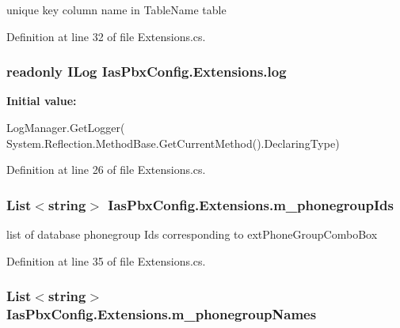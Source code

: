 unique key column name in TableName table 

Definition at line 32 of file Extensions.cs.\hypertarget{class_ias_pbx_config_1_1_extensions_ab43ad241e3cdaf1c1d00df49f8e1e3de}{
\subsubsection[{log}]{\setlength{\rightskip}{0pt plus 5cm}readonly ILog {\bf IasPbxConfig.Extensions.log}}}
\label{class_ias_pbx_config_1_1_extensions_ab43ad241e3cdaf1c1d00df49f8e1e3de}
{\bfseries Initial value:}
\begin{DoxyCode}
 LogManager.GetLogger(
            System.Reflection.MethodBase.GetCurrentMethod().DeclaringType)
\end{DoxyCode}


Definition at line 26 of file Extensions.cs.\hypertarget{class_ias_pbx_config_1_1_extensions_afc9ff97b0452641769562d9a8104cf20}{
\subsubsection[{m\_\-phonegroupIds}]{\setlength{\rightskip}{0pt plus 5cm}List$<$string$>$ {\bf IasPbxConfig.Extensions.m\_\-phonegroupIds}}}
\label{class_ias_pbx_config_1_1_extensions_afc9ff97b0452641769562d9a8104cf20}


list of database phonegroup Ids corresponding to extPhoneGroupComboBox 

Definition at line 35 of file Extensions.cs.\hypertarget{class_ias_pbx_config_1_1_extensions_a5f79a5d0c5d3fb9d6c6a5a808258499e}{
\subsubsection[{m\_\-phonegroupNames}]{\setlength{\rightskip}{0pt plus 5cm}List$<$string$>$ {\bf IasPbxConfig.Extensions.m\_\-phonegroupNames}}}
\label{class_ias_pbx_config_1_1_extensions_a5f79a5d0c5d3fb9d6c6a5a808258499e}


